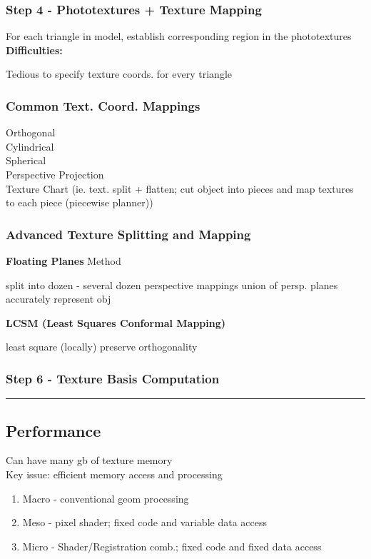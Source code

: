 \documentclass{article}
\begin{document}
\subsubsection*{Step 4 - Phototextures + Texture Mapping}
For each triangle in model, establish corresponding region in the phototextures
\\
\textbf{Difficulties:}
\begin{outline}
  \1 Tedious to specify texture coords. for every triangle
\end{outline}

\subsubsection{Common Text. Coord. Mappings}
Orthogonal
\\
Cylindrical
\\
Spherical
\\
Perspective Projection
\\
Texture Chart (ie. text. split + flatten; cut object into pieces and map textures to each piece (piecewise planner))

\subsubsection{Advanced Texture Splitting and Mapping}
\textbf{Floating Planes} Method
\begin{outline}
  \1 split into dozen - several dozen perspective mappings
  \1 union of persp. planes accurately represent obj
\end{outline}
\noindent
\textbf{LCSM (Least Squares Conformal Mapping)}
\begin{outline}
  \1 least square (locally) preserve orthogonality
\end{outline}




\subsubsection*{Step 6 - Texture Basis Computation}


\noindent\rule{\textwidth}{0.1pt}

\subsection{Performance}
Can have many gb of texture memory
\\
Key issue: efficient memory access and processing
\begin{enumerate}
  \item Macro - conventional geom processing
  \item Meso - pixel shader; fixed code and variable data access
  \item Micro - Shader/Registration comb.; fixed code and fixed data access 
\end{enumerate}
\end{document}
